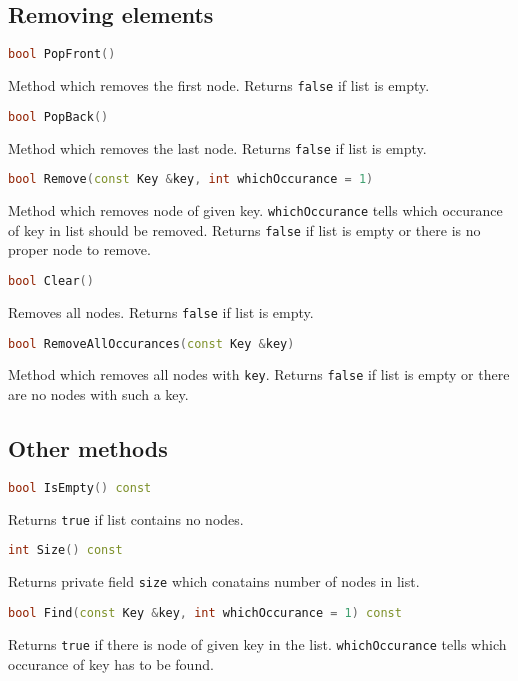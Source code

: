 \documentclass{article}
\begin{document}
\subsection{Removing elements}

\begin{lstlisting}[language=C++]
bool PopFront()
\end{lstlisting}
Method which removes the first node. Returns {\tt false} if list is empty.

\begin{lstlisting}[language=C++]
bool PopBack()
\end{lstlisting}
Method which removes the last node. Returns {\tt false} if list is empty.

\begin{lstlisting}[language=C++]
bool Remove(const Key &key, int whichOccurance = 1)
\end{lstlisting}
Method which removes node of given key. {\tt whichOccurance} tells which occurance
of key in list should be removed. Returns {\tt false} if list is empty or there is
no proper node to remove.

\begin{lstlisting}[language=C++]
bool Clear()
\end{lstlisting}
Removes all nodes. Returns {\tt false} if list is empty.

\begin{lstlisting}[language=C++]
bool RemoveAllOccurances(const Key &key)
\end{lstlisting}
Method which removes all nodes with {\tt key}. Returns {\tt false} if list is empty
or there are no nodes with such a key.
\vspace{\baselineskip}

\subsection{Other methods}

\begin{lstlisting}[language=C++]
bool IsEmpty() const
\end{lstlisting}
Returns {\tt true} if list contains no nodes.

\begin{lstlisting}[language=C++]
int Size() const
\end{lstlisting}
Returns private field {\tt size} which conatains number of nodes in list.

\begin{lstlisting}[language=C++]
bool Find(const Key &key, int whichOccurance = 1) const
\end{lstlisting}
Returns {\tt true} if there is node of given key in the list. {\tt whichOccurance}
tells which occurance of key has to be found.
\end{document}
